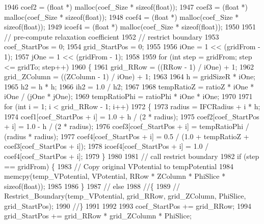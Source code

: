\begin{DoxyCode}
1946     coef2 = (\textcolor{keywordtype}{float} *) malloc(coef\_Size * \textcolor{keyword}{sizeof}(\textcolor{keywordtype}{float}));
1947     coef3 = (\textcolor{keywordtype}{float} *) malloc(coef\_Size * \textcolor{keyword}{sizeof}(\textcolor{keywordtype}{float}));
1948     coef4 = (\textcolor{keywordtype}{float} *) malloc(coef\_Size * \textcolor{keyword}{sizeof}(\textcolor{keywordtype}{float}));
1949     icoef4 = (\textcolor{keywordtype}{float} *) malloc(coef\_Size * \textcolor{keyword}{sizeof}(\textcolor{keywordtype}{float}));
1950 
1951     \textcolor{comment}{// pre-compute relaxation coefficient}
1952     \textcolor{comment}{// restrict boundary}
1953     coef\_StartPos = 0;
1954     grid\_StartPos = 0;
1955 
1956     iOne = 1 << (gridFrom - 1); 
1957     jOne = 1 << (gridFrom - 1);
1958     
1959     \textcolor{keywordflow}{for} (\textcolor{keywordtype}{int} step = gridFrom; step <= gridTo; step++)
1960     \{
1961         grid\_RRow = ((RRow - 1) / iOne) + 1;
1962         grid\_ZColumn = ((ZColumn - 1) / iOne) + 1;
1963 
1964         h = gridSizeR * iOne;
1965         h2 = h * h;
1966         ih2 = 1.0 / h2;
1967 
1968         tempRatioZ = ratioZ * iOne * iOne / (jOne * jOne);
1969         tempRatioPhi = ratioPhi * iOne * iOne;
1970 
1971         \textcolor{keywordflow}{for} (\textcolor{keywordtype}{int} i = 1; i < grid\_RRow - 1; i++)
1972         \{
1973             radius = IFCRadius + i * h;
1974             coef1[coef\_StartPos + i] = 1.0 + h / (2 * radius);
1975             coef2[coef\_StartPos + i] = 1.0 - h / (2 * radius);
1976             coef3[coef\_StartPos + i] = tempRatioPhi / (radius * radius);
1977             coef4[coef\_StartPos + i] = 0.5 / (1.0 + tempRatioZ + coef3[coef\_StartPos + i]);
1978             icoef4[coef\_StartPos + i] = 1.0 / coef4[coef\_StartPos + i];
1979         \}
1980 
1981         \textcolor{comment}{// call restrict boundary}
1982         \textcolor{keywordflow}{if} (step == gridFrom) \{
1983             \textcolor{comment}{// Copy original VPotential to tempPotential}
1984             memcpy(temp\_VPotential,     VPotential, RRow * ZColumn * PhiSlice * \textcolor{keyword}{sizeof}(\textcolor{keywordtype}{float}));
1985                     
1986         \} 
1987         \textcolor{comment}{// else }
1988         \textcolor{comment}{//\{}
1989         \textcolor{comment}{//  Restrict\_Boundary(temp\_VPotential, grid\_RRow, grid\_ZColumn, PhiSlice, grid\_StartPos);}
1990         \textcolor{comment}{//\}}
1991 
1992         
1993         coef\_StartPos += grid\_RRow;
1994         grid\_StartPos += grid\_RRow * grid\_ZColumn * PhiSlice;

\end{DoxyCode}

